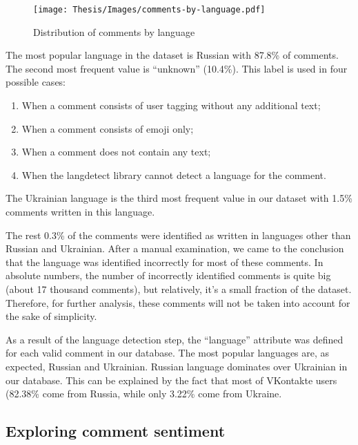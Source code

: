 \begin{figure}
	\centering
	\texttt{[image: Thesis/Images/comments-by-language.pdf]}
	\caption{Distribution of comments by language}
	\label{fig:comments-by-language}
\end{figure}

The most popular language in the dataset is Russian with 87.8\% of comments. The second most frequent value is ``unknown'' (10.4\%). This label is used in four possible cases:
\begin{enumerate}
    \item When a comment consists of user tagging without any additional text;
    \item When a comment consists of emoji only;
    \item When a comment does not contain any text;
    \item When the langdetect library cannot detect a language for the comment.
\end{enumerate}

The Ukrainian language is the third most frequent value in our dataset with 1.5\% comments written in this language.

The rest 0.3\% of the comments were identified as written in languages other than Russian and Ukrainian. After a manual examination, we came to the conclusion that the language was identified incorrectly for most of these comments. In absolute numbers, the number of incorrectly identified comments is quite big (about 17 thousand comments), but relatively, it’s a small fraction of the dataset. Therefore, for further analysis, these comments will not be taken into account for the sake of simplicity.

As a result of the language detection step, the ``language'' attribute was defined for each valid comment in our database. The most popular languages are, as expected, Russian and Ukrainian. Russian language dominates over Ukrainian in our database. This can be explained by the fact that most of VKontakte users (82.38\% come from Russia, while only 3.22\% come from Ukraine\cite{vkGeography}.

\subsection{Exploring comment sentiment}

